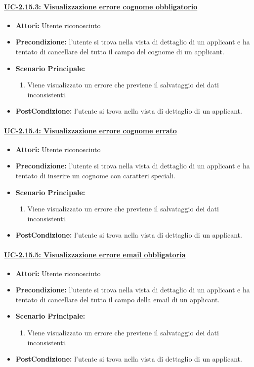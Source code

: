 \paragraph{\underline{UC-2.15.3: Visualizzazione errore cognome obbligatorio}}
\begin{itemize}	
	\item \textbf{Attori:} Utente riconosciuto
	\item \textbf{Precondizione:}  l'utente si trova nella vista di dettaglio di un applicant e ha tentato di cancellare del tutto il campo del cognome di un applicant.
	\item \textbf{Scenario Principale:}
	\begin{enumerate}
		\item Viene visualizzato un errore che previene il salvataggio dei dati inconsistenti.
	\end{enumerate}
	\item \textbf{PostCondizione:} l'utente si trova nella vista di dettaglio di un applicant.
\end{itemize}

\paragraph{\underline{UC-2.15.4: Visualizzazione errore cognome errato}}
\begin{itemize}	
	\item \textbf{Attori:} Utente riconosciuto
	\item \textbf{Precondizione:}  l'utente si trova nella vista di dettaglio di un applicant e ha tentato di inserire un cognome con caratteri speciali.
	\item \textbf{Scenario Principale:}
	\begin{enumerate}
		\item Viene visualizzato un errore che previene il salvataggio dei dati inconsistenti.
	\end{enumerate}
	\item \textbf{PostCondizione:} l'utente si trova nella vista di dettaglio di un applicant.
\end{itemize}

\paragraph{\underline{UC-2.15.5: Visualizzazione errore email obbligatoria}}
\begin{itemize}	
	\item \textbf{Attori:} Utente riconosciuto
	\item \textbf{Precondizione:}  l'utente si trova nella vista di dettaglio di un applicant e ha tentato di cancellare del tutto il campo della email di un applicant.
	\item \textbf{Scenario Principale:}
	\begin{enumerate}
		\item Viene visualizzato un errore che previene il salvataggio dei dati inconsistenti.
	\end{enumerate}
	\item \textbf{PostCondizione:} l'utente si trova nella vista di dettaglio di un applicant.
\end{itemize}

